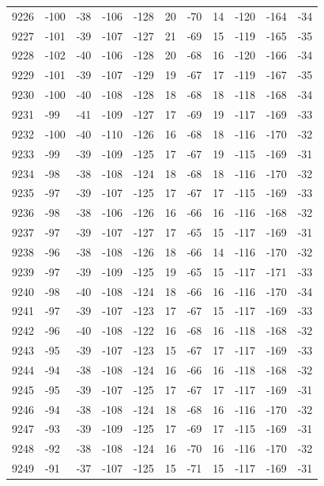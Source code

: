 \begin{table}[H]
\begin{tabular}{lllllllllll}
9226 & -100 & -38 & -106 & -128 & 20 & -70 & 14 & -120 & -164 & -34 \\
9227 & -101 & -39 & -107 & -127 & 21 & -69 & 15 & -119 & -165 & -35 \\
9228 & -102 & -40 & -106 & -128 & 20 & -68 & 16 & -120 & -166 & -34 \\
9229 & -101 & -39 & -107 & -129 & 19 & -67 & 17 & -119 & -167 & -35 \\
9230 & -100 & -40 & -108 & -128 & 18 & -68 & 18 & -118 & -168 & -34 \\
9231 & -99 & -41 & -109 & -127 & 17 & -69 & 19 & -117 & -169 & -33 \\
9232 & -100 & -40 & -110 & -126 & 16 & -68 & 18 & -116 & -170 & -32 \\
9233 & -99 & -39 & -109 & -125 & 17 & -67 & 19 & -115 & -169 & -31 \\
9234 & -98 & -38 & -108 & -124 & 18 & -68 & 18 & -116 & -170 & -32 \\
9235 & -97 & -39 & -107 & -125 & 17 & -67 & 17 & -115 & -169 & -33 \\
9236 & -98 & -38 & -106 & -126 & 16 & -66 & 16 & -116 & -168 & -32 \\
9237 & -97 & -39 & -107 & -127 & 17 & -65 & 15 & -117 & -169 & -31 \\
9238 & -96 & -38 & -108 & -126 & 18 & -66 & 14 & -116 & -170 & -32 \\
9239 & -97 & -39 & -109 & -125 & 19 & -65 & 15 & -117 & -171 & -33 \\
9240 & -98 & -40 & -108 & -124 & 18 & -66 & 16 & -116 & -170 & -34 \\
9241 & -97 & -39 & -107 & -123 & 17 & -67 & 15 & -117 & -169 & -33 \\
9242 & -96 & -40 & -108 & -122 & 16 & -68 & 16 & -118 & -168 & -32 \\
9243 & -95 & -39 & -107 & -123 & 15 & -67 & 17 & -117 & -169 & -33 \\
9244 & -94 & -38 & -108 & -124 & 16 & -66 & 16 & -118 & -168 & -32 \\
9245 & -95 & -39 & -107 & -125 & 17 & -67 & 17 & -117 & -169 & -31 \\
9246 & -94 & -38 & -108 & -124 & 18 & -68 & 16 & -116 & -170 & -32 \\
9247 & -93 & -39 & -109 & -125 & 17 & -69 & 17 & -115 & -169 & -31 \\
9248 & -92 & -38 & -108 & -124 & 16 & -70 & 16 & -116 & -170 & -32 \\
9249 & -91 & -37 & -107 & -125 & 15 & -71 & 15 & -117 & -169 & -31 \\

\end{tabular}
\end{table}
